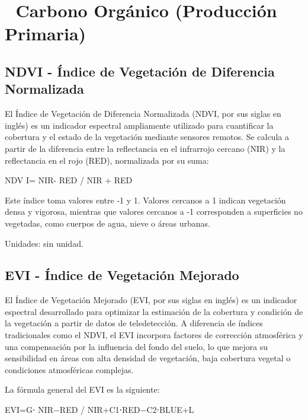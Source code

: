 \documentclass[
]{book}
\begin{document}
\section{\texorpdfstring{\textbf{🌱 Carbono Orgánico (Producción Primaria)}}{🌱 Carbono Orgánico (Producción Primaria)}}\label{carbono-orguxe1nico-producciuxf3n-primaria}

\subsection{\texorpdfstring{\textbf{NDVI} - Índice de Vegetación de Diferencia Normalizada}{NDVI - Índice de Vegetación de Diferencia Normalizada}}\label{ndvi---uxedndice-de-vegetaciuxf3n-de-diferencia-normalizada}

El Índice de Vegetación de Diferencia Normalizada (NDVI, por sus siglas en inglés) es un indicador espectral ampliamente utilizado para cuantificar la cobertura y el estado de la vegetación mediante sensores remotos. Se calcula a partir de la diferencia entre la reflectancia en el infrarrojo cercano (NIR) y la reflectancia en el rojo (RED), normalizada por su suma:

NDV I= NIR- RED / NIR + RED

Este índice toma valores entre -1 y 1. Valores cercanos a 1 indican vegetación densa y vigorosa, mientras que valores cercanos a -1 corresponden a superficies no vegetadas, como cuerpos de agua, nieve o áreas urbanas.

Unidades: sin unidad.

\subsection{\texorpdfstring{\textbf{EVI} - Índice de Vegetación Mejorado}{EVI - Índice de Vegetación Mejorado}}\label{evi---uxedndice-de-vegetaciuxf3n-mejorado}

El Índice de Vegetación Mejorado (EVI, por sus siglas en inglés) es un indicador espectral desarrollado para optimizar la estimación de la cobertura y condición de la vegetación a partir de datos de teledetección. A diferencia de índices tradicionales como el NDVI, el EVI incorpora factores de corrección atmosférica y una compensación por la influencia del fondo del suelo, lo que mejora su sensibilidad en áreas con alta densidad de vegetación, baja cobertura vegetal o condiciones atmosféricas complejas.

La fórmula general del EVI es la siguiente:

EVI=G⋅ NIR−RED / NIR+C1\hspace{0pt}⋅RED−C2\hspace{0pt}⋅BLUE+L
\end{document}
